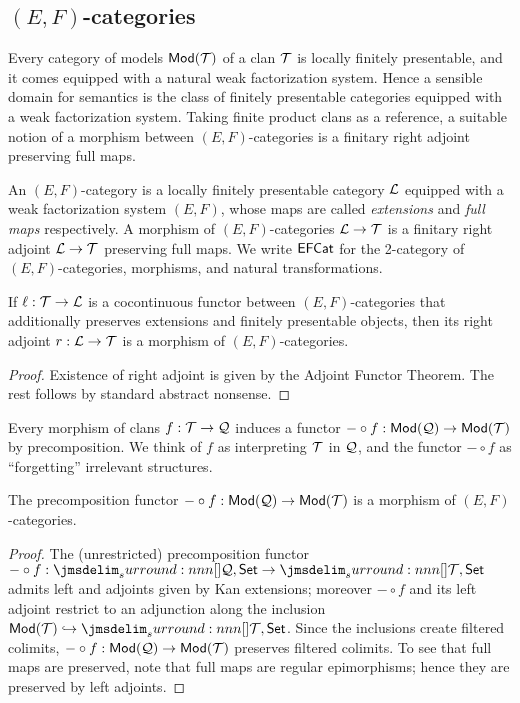 \documentclass[a4paper]{article}
\begin{document}
\subsection{$(E,F)$-categories}

Every category of models $\mathsf{Mod}(\mathcal{T})$ of a clan $\mathcal{T}$ is locally finitely presentable, and it comes equipped with a natural weak factorization system.
Hence a sensible domain for semantics is the class of finitely presentable categories equipped with a weak factorization system.
Taking finite product clans as a reference, a suitable notion of a morphism between $(E,F)$-categories is a finitary right adjoint preserving full maps.

\begin{definition}
  An $(E,F)$-category is a locally finitely presentable category $\mathcal{L}$ equipped with a weak factorization system $(E,F)$, whose maps are called \emph{extensions} and \emph{full maps} respectively.
  A morphism of $(E,F)$-categories $\mathcal{L} \to \mathcal{T}$ is a finitary right adjoint $\mathcal{L} \to \mathcal{T}$ preserving full maps.
  We write $\mathsf{EFCat}$ for the 2-category of $(E,F)$-categories, morphisms, and natural transformations.
\end{definition}

\begin{lemma}
  If $\ell : \mathcal{T} \to \mathcal{L}$ is a cocontinuous functor between $(E,F)$-categories that additionally preserves extensions and finitely presentable objects, then its right adjoint $r : \mathcal{L} \to \mathcal{T}$ is a morphism of $(E,F)$-categories.
\end{lemma}
\begin{proof}
  Existence of right adjoint is given by the Adjoint Functor Theorem.
  The rest follows by standard abstract nonsense.
\end{proof}

Every morphism of clans $f : \mathcal{T} \to \mathcal{Q}$ induces a functor $- \circ f : \mathsf{Mod}(\mathcal{Q}) \to \mathsf{Mod}(\mathcal{T})$ by precomposition.
We think of $f$ as interpreting $\mathcal{T}$ in $\mathcal{Q}$, and the functor $- \circ f$ as ``forgetting'' irrelevant structures.

\begin{lemma}
  The precomposition functor $- \circ f : \mathsf{Mod}(\mathcal{Q}) \to \mathsf{Mod}(\mathcal{T})$ is a morphism of $(E,F)$-categories.
\end{lemma}
\begin{proof}
  The (unrestricted) precomposition functor $- \circ f : \funCat{\cQ}{\Set} \to \funCat{\cT}{\Set}$ admits left and adjoints given by Kan extensions; moreover $- \circ f$ and its left adjoint restrict to an adjunction along the inclusion $\Mod(\cT) \into \funCat{\cT}{\Set}$.
  Since the inclusions create filtered colimits, $- \circ f : \mathsf{Mod}(\mathcal{Q}) \to \mathsf{Mod}(\mathcal{T})$ preserves filtered colimits.
  To see that full maps are preserved, note that full maps are regular epimorphisms; hence they are preserved by left adjoints.
\end{proof}
\end{document}
